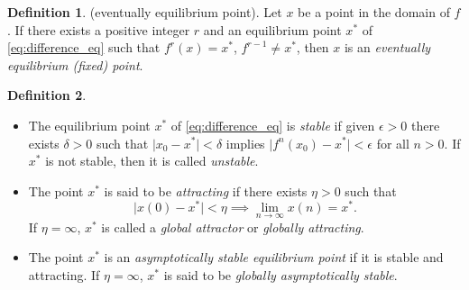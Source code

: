 \documentclass{article}
\theoremstyle{plain}
\theoremstyle{definition}
\newtheorem{defn}{Definition}[section]
\theoremstyle{remark}
\begin{document}
\begin{defn} (eventually equilibrium point).
    Let \(x\) be a point in the domain of \(f\). If there exists a positive integer \(r\) and an equilibrium point \(x^*\) of \eqref{eq:difference_eq} such that \(f^r(x) = x^*\), \(f^{r-1} \neq x^*\), then \(x\) is an \emph{eventually equilibrium (fixed) point}.
\end{defn}

\begin{defn}
    \begin{itemize}
        \item [(a)] The equilibrium point \(x^*\) of \eqref{eq:difference_eq} is \emph{stable} if given \(\epsilon > 0\) there exists \(\delta > 0\) such that \(\vert x_0 - x^* \vert < \delta\) implies \(\vert f^n(x_0) - x^* \vert < \epsilon\) for all \(n > 0\). If \(x^*\) is not stable, then it is called \emph{unstable}.
        \item [(b)] The point \(x^*\) is said to be \emph{attracting} if there exists \(\eta > 0\) such that \[\vert x(0) - x^* \vert < \eta \implies \lim_{n\to\infty} x(n) = x^*.\] If \(\eta = \infty\), \(x^*\) is called a \emph{global attractor} or \emph{globally attracting}.
        \item [(c)] The point \(x^*\) is an \emph{asymptotically stable equilibrium point} if it is stable and attracting. If \(\eta = \infty\), \(x^*\) is said to be \emph{globally asymptotically stable}.
    \end{itemize}

\end{defn}
\end{document}
